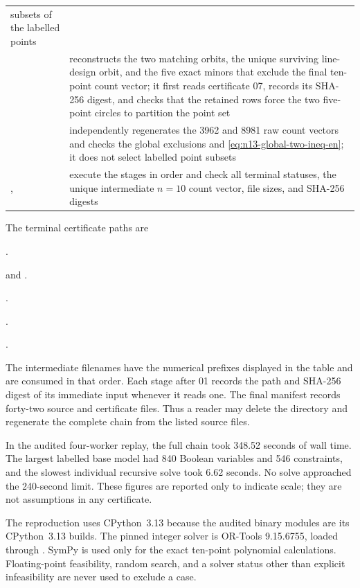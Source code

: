 \begin{longtable}{P{6.2cm}P{8.3cm}}
subsets of the labelled points\\
 & reconstructs the two matching
orbits, the unique surviving line-design orbit, and the five exact minors that
exclude the final ten-point count vector; it first reads certificate 07, records
its SHA-256 digest, and checks that the retained rows force the two five-point
circles to partition the point set\\
 & independently regenerates the
3962 and 8981 raw count vectors and checks the global exclusions and
\eqref{eq:n13-global-two-ineq-en}; it does not select labelled point subsets\\
,  & execute the stages in
order and check all terminal statuses, the unique intermediate $n=10$ count
vector, file sizes, and SHA-256 digests\\
\bottomrule
\end{longtable}

The terminal certificate paths are
{\raggedright
\begin{description}[style=nextline,leftmargin=2.8em]
\item[$n=9$] .
\item[$n=10$]  and
  .
\item[$n=11$] .
\item[$n=12$] .
\item[$n=13,14$] .
\end{description}
\par}
The intermediate filenames have the numerical prefixes displayed in the
table and are consumed in that order.  Each stage after 01 records the path
and SHA-256 digest of its immediate input whenever it reads one.  The final
manifest records forty-two source and certificate files.  Thus a reader may
delete the  directory and regenerate the complete chain
from the listed source files.

In the audited four-worker replay, the full chain took 348.52 seconds of wall
time.  The largest labelled base model had 840 Boolean variables and 546
constraints, and the slowest individual recursive solve took 6.62 seconds.
No solve approached the 240-second limit.  These figures are reported only to
indicate scale; they are not assumptions in any certificate.

The reproduction uses CPython~3.13 because the audited binary modules are its
CPython~3.13 builds.  The pinned integer solver is OR-Tools 9.15.6755, loaded through
.  SymPy is used only for the exact
ten-point polynomial calculations.  Floating-point feasibility, random
search, and a solver status other than explicit infeasibility are never used
to exclude a case.
